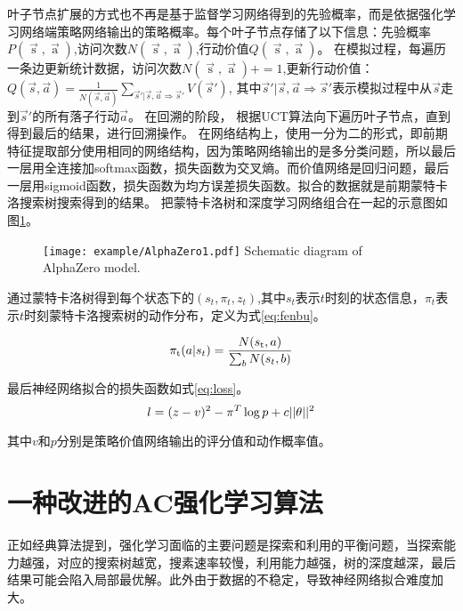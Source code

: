 叶子节点扩展的方式也不再是基于监督学习网络得到的先验概率，而是依据强化学习网络端策略网络输出的策略概率。每个叶子节点存储了以下信息：先验概率$P(\mathop s\limits^ \to  ,\mathop a\limits^ \to  )$,访问次数$N(\mathop s\limits^ \to  ,\mathop a\limits^ \to  )$,行动价值$Q(\mathop s\limits^ \to  ,\mathop a\limits^ \to  )$。
在模拟过程，每遍历一条边更新统计数据，访问次数${N(\mathop s\limits^ \to  ,\mathop a\limits^ \to  )} +=1$,更新行动价值：$Q(\vec{s},\vec{a})=\frac{1}{N(\vec{s},\vec{a})}\sum_{\vec{s}'\vert \vec{s},\vec{a}\Rightarrow \vec{s}'}V(\vec{s}')$, 其中$\vec{s}'\vert \vec{s},\vec{a} \Rightarrow \vec{s}'$表示模拟过程中从$\vec{s}$走到$\vec{s}'$的所有落子行动$\vec{a}$。
在回溯的阶段，
根据UCT算法向下遍历叶子节点，直到得到最后的结果，进行回溯操作。
在网络结构上，使用一分为二的形式，即前期特征提取部分使用相同的网络结构，因为策略网络输出的是多分类问题，所以最后一层用全连接加softmax函数，损失函数为交叉熵。而价值网络是回归问题，最后一层用sigmoid函数，损失函数为均方误差损失函数。拟合的数据就是前期蒙特卡洛搜索树搜索得到的结果。
把蒙特卡洛树和深度学习网络组合在一起的示意图如图\ref{fig:Alphazero1}。

\begin{figure}[htbp]
	\centering
	\texttt{[image: example/AlphaZero1.pdf]}
	{Schematic diagram of AlphaZero model.}
	\label{fig:Alphazero1}
\end{figure}

通过蒙特卡洛树得到每个状态下的$({s_t},{\pi _t},{z_t})$,其中$s_t$表示$t$时刻的状态信息，$\pi_t$表示$t$时刻蒙特卡洛搜索树的动作分布，定义为式\ref{eq:fenbu}。

\begin{equation}
\label{eq:fenbu}
{\pi _{\rm{t}}}(a|{s_t}) = \frac{{N({s_{\rm{t}}},a)}}{{\sum\nolimits_b {N({s_t},b)} }}
\end{equation}

最后神经网络拟合的损失函数如式\ref{eq:loss}。
\begin{equation}
\label{eq:loss}
l = {(z - v)^2} - {\pi ^T}\log p + c{\rm{||}}\theta {\rm{|}}{{\rm{|}}^2}
\end{equation}

其中$v$和$p$分别是策略价值网络输出的评分值和动作概率值。

\section{一种改进的AC强化学习算法}

正如经典算法提到，强化学习面临的主要问题是探索和利用的平衡问题，当探索能力越强，对应的搜索树越宽，搜素速率较慢，利用能力越强，树的深度越深，最后结果可能会陷入局部最优解。此外由于数据的不稳定，导致神经网络拟合难度加大。

